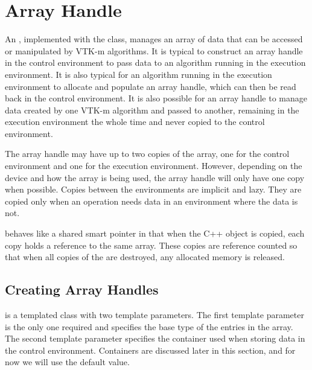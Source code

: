 

\section{Array Handle}
\label{sec:ArrayHandle}


An , implemented with the 
class, manages an array of data that can be accessed or manipulated by VTK-m
algorithms. It is typical to construct an array handle in the control
environment to pass data to an algorithm running in the execution
environment. It is also typical for an algorithm running in the execution
environment to allocate and populate an array handle, which can then be
read back in the control environment. It is also possible for an array
handle to manage data created by one VTK-m algorithm and passed to another,
remaining in the execution environment the whole time and never copied to
the control environment.

The array handle may have up to two copies of the array, one for the
control environment and one for the execution environment. However,
depending on the device and how the array is being used, the array handle
will only have one copy when possible. Copies between the environments are
implicit and lazy. They are copied only when an operation needs data in an
environment where the data is not.

 behaves like a shared smart pointer in that when the
C++ object is copied, each copy holds a reference to the same array. These
copies are reference counted so that when all copies of the
 are destroyed, any allocated memory is released.

\subsection{Creating Array Handles}

 is a templated class with two template
parameters. The first template parameter is the only one required and
specifies the base type of the entries in the array. The second template
parameter specifies the container used when storing data in the control
environment. Containers are discussed later in this section, and for now we
will use the default value.

